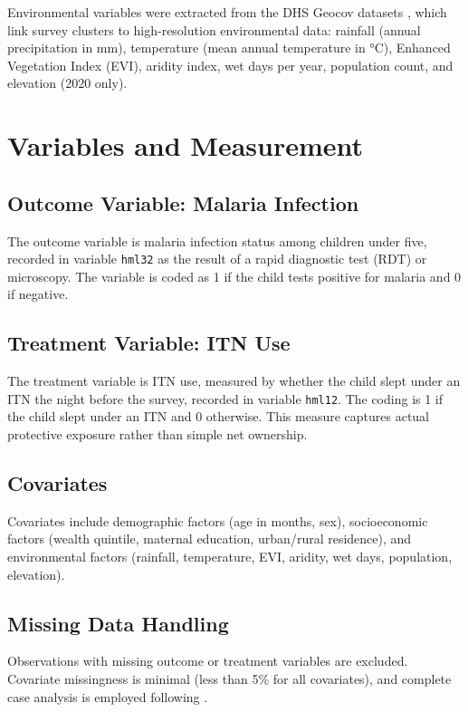 Environmental variables were extracted from the DHS Geocov datasets \citep{dhsgeocov}, which link survey clusters to high-resolution environmental data: rainfall (annual precipitation in mm), temperature (mean annual temperature in °C), Enhanced Vegetation Index (EVI), aridity index, wet days per year, population count, and elevation (2020 only).

\section{Variables and Measurement}

\subsection{Outcome Variable: Malaria Infection}

The outcome variable is malaria infection status among children under five, recorded in variable \texttt{hml32} as the result of a rapid diagnostic test (RDT) or microscopy. The variable is coded as 1 if the child tests positive for malaria and 0 if negative. 

\subsection{Treatment Variable: ITN Use}

The treatment variable is ITN use, measured by whether the child slept under an ITN the night before the survey, recorded in variable \texttt{hml12}. The coding is 1 if the child slept under an ITN and 0 otherwise. This measure captures actual protective exposure rather than simple net ownership.

\subsection{Covariates}

Covariates include demographic factors (age in months, sex), socioeconomic factors (wealth quintile, maternal education, urban/rural residence), and environmental factors (rainfall, temperature, EVI, aridity, wet days, population, elevation).

\subsection{Missing Data Handling}

Observations with missing outcome or treatment variables are excluded. Covariate missingness is minimal (less than 5\% for all covariates), and complete case analysis is employed following \citet{little2019statistical}.

